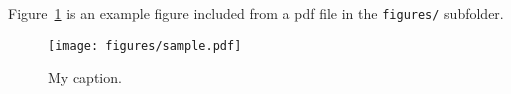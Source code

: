 \documentclass[12pt]{article}
\begin{document}
Figure~\ref{fig:examplepdf} is an example figure included from a pdf file in the \texttt{figures/} subfolder.
\begin{figure}[h]
\centering
\texttt{[image: figures/sample.pdf]}
\caption{My caption.}
\label{fig:examplepdf}
\end{figure}



\end{document}

